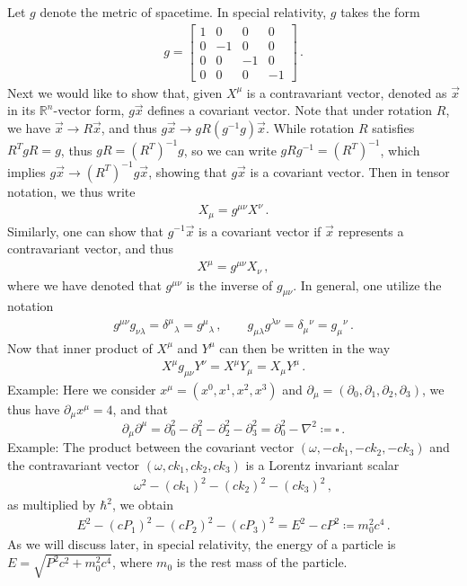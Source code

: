 \documentclass[11pt, onesided]{book}
\theoremstyle{break}
\theoremstyle{break}
\newcommand{\R}{\mathbb{R}}
\newcommand{\pd}{\partial}
\newcommand{\bmat}[1]{\begin{bmatrix} #1 \end{bmatrix}}
\newcommand{\example}{\color{green}Example: \color{black}}
\begin{document}
Let $g$ denote the metric of spacetime. In special relativity, $g$ takes the form
\begin{align*}
g = \bmat{1 & 0 & 0 & 0\\
0 & -1 & 0 & 0\\
0 & 0 & -1 & 0\\
0 & 0 & 0 & -1}\,.
\end{align*}
Next we would like to show that, given $X^\mu$ is a contravariant vector, denoted as $\vec{x}$ in its $\R^n$-vector form, $g\vec{x}$ defines a covariant vector. Note that under rotation $R$, we have $\vec{x}\to R\vec{x}$, and thus $g\vec{x} \to gR(g^{-1}g)\vec{x}$. While rotation $R$ satisfies $R^TgR = g$, thus $gR = (R^T)^{-1} g$, so we can write $gRg^{-1} = (R^T)^{-1}$, which implies $g\vec{x}\to (R^T)^{-1}g\vec{x}$, showing that $g\vec{x}$ is a covariant vector. Then in tensor notation, we thus write
\begin{align*}
X_\mu = g^{\mu\nu}X^\nu\,.
\end{align*}
Similarly, one can show that $g^{-1}\vec{x}$ is a covariant vector if $\vec{x}$ represents a contravariant vector, and thus
\begin{align*}
X^\mu = g^{\mu\nu}X_\nu\,,
\end{align*}
where we have denoted that $g^{\mu\nu}$ is the inverse of $g_{\mu\nu}$. In general, one utilize the notation 
\begin{align*}
g^{\mu\nu}g_{\nu \lambda} = \delta^\mu{}_\lambda = g^{\mu}{}_\lambda\,,\qquad
g_{\mu\lambda}g^{\lambda\nu} = \delta_\mu{}^\nu = g_\mu{}^\nu\,.
\end{align*}
Now that inner product of $X^\mu$ and $Y^\mu$ can then be written in the way
\begin{align*}
X^\mu g_{\mu\nu} Y^\nu=X^\mu Y_\mu = X_\mu Y^\mu \,.
\end{align*}
\example Here we consider $x^\mu = (x^0,x^1,x^2,x^3)$ and $\pd_\mu = (\pd_0,\pd_1,\pd_2,\pd_3)$, we thus have $\pd_\mu x^\mu = 4$, and that 
$$\pd_\mu \pd^\mu = \pd_0^2 - \pd_1^2 - \pd_2^2 - \pd_3^2 = \pd_0^2 - \nabla^2 \coloneqq \square\,.$$
\example The product between the covariant vector $(\omega, -ck_1, -ck_2, -ck_3)$ and the contravariant vector $(\omega, ck_1, ck_2, ck_3)$ is a Lorentz invariant scalar
\begin{align*}
\omega^2 -( ck_1)^2 - (ck_2)^2 - (ck_3)^2\,,
\end{align*}
as multiplied by $\hbar^2$, we obtain
\begin{align*}
E^2 - (cP_1)^2 - (cP_2)^2 - (cP_3)^2 = E^2 - cP^2 \coloneqq m_0^2 c^4\,.
\end{align*}
As we will discuss later, in special relativity, the energy of a particle is $E = \sqrt{P^2c^2 +m_0^2 c^4}$, where $m_0$ is the rest mass of the particle. \\
\end{document}
